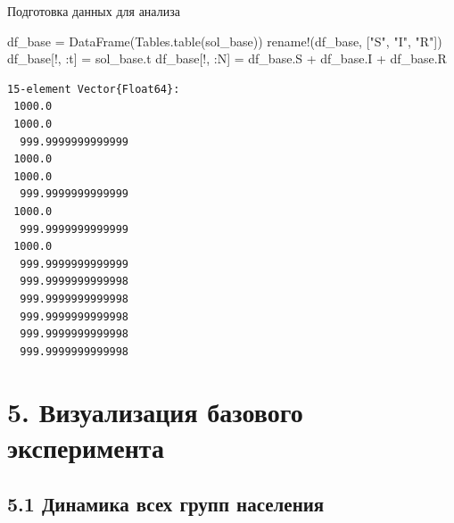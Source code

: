 \documentclass[
  12pt,
  a4paper,
  DIV=11,
  numbers=noendperiod]{scrreprt}
\newenvironment{Shaded}{\begin{snugshade}}{\end{snugshade}}
\newcommand{\FunctionTok}[1]{\textcolor[rgb]{0.28,0.35,0.67}{#1}}
\newcommand{\NormalTok}[1]{\textcolor[rgb]{0.00,0.23,0.31}{#1}}
\newcommand{\OperatorTok}[1]{\textcolor[rgb]{0.37,0.37,0.37}{#1}}
\newcommand{\StringTok}[1]{\textcolor[rgb]{0.13,0.47,0.30}{#1}}
\begin{document}
Подготовка данных для анализа

\begin{Shaded}
\begin{Highlighting}[]
\NormalTok{df\_base }\OperatorTok{=} \FunctionTok{DataFrame}\NormalTok{(Tables.}\FunctionTok{table}\NormalTok{(sol\_base}\OperatorTok{\textquotesingle{}}\NormalTok{))}
\FunctionTok{rename!}\NormalTok{(df\_base, [}\StringTok{"S"}\NormalTok{, }\StringTok{"I"}\NormalTok{, }\StringTok{"R"}\NormalTok{])}
\NormalTok{df\_base[!, }\OperatorTok{:}\NormalTok{t] }\OperatorTok{=}\NormalTok{ sol\_base.t}
\NormalTok{df\_base[!, }\OperatorTok{:}\NormalTok{N] }\OperatorTok{=}\NormalTok{ df\_base.S }\OperatorTok{+}\NormalTok{ df\_base.I }\OperatorTok{+}\NormalTok{ df\_base.R}
\end{Highlighting}
\end{Shaded}

\begin{verbatim}
15-element Vector{Float64}:
 1000.0
 1000.0
  999.9999999999999
 1000.0
 1000.0
  999.9999999999999
 1000.0
  999.9999999999999
 1000.0
  999.9999999999999
  999.9999999999998
  999.9999999999998
  999.9999999999998
  999.9999999999998
  999.9999999999998
\end{verbatim}

\section{5. Визуализация базового
эксперимента}\label{ux432ux438ux437ux443ux430ux43bux438ux437ux430ux446ux438ux44f-ux431ux430ux437ux43eux432ux43eux433ux43e-ux44dux43aux441ux43fux435ux440ux438ux43cux435ux43dux442ux430}

\subsection{5.1 Динамика всех групп
населения}\label{ux434ux438ux43dux430ux43cux438ux43aux430-ux432ux441ux435ux445-ux433ux440ux443ux43fux43f-ux43dux430ux441ux435ux43bux435ux43dux438ux44f}
\end{document}
